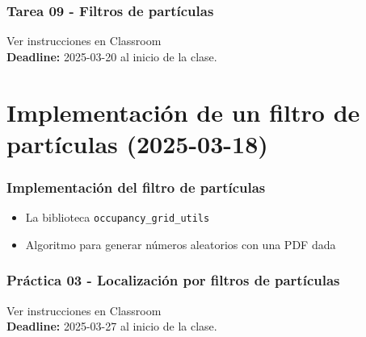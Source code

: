 \begin{frame}[containsverbatim]\frametitle{Tarea 09 - Filtros de partículas}
  Ver instrucciones en Classroom
  \[\]
  \textbf{Deadline: } 2025-03-20 al inicio de la clase. 
\end{frame}



\section{Implementación de un filtro de partículas (2025-03-18)}
\begin{frame}\frametitle{Implementación del filtro de partículas}
  \begin{itemize}
  \item La biblioteca \texttt{occupancy\_grid\_utils}
  \item Algoritmo para generar números aleatorios con una PDF dada
  \end{itemize}
\end{frame}

\begin{frame}[containsverbatim]\frametitle{Práctica 03 - Localización por filtros de partículas}
  Ver instrucciones en Classroom
  \[\]
  \textbf{Deadline: } 2025-03-27 al inicio de la clase. 
\end{frame}









